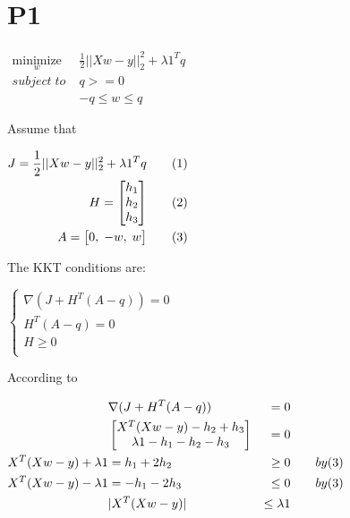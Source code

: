 \documentclass{article}
\newcommand{\under}[2]{\mathop{#1}\limits_{#2}}
\newcommand{\B}[1]{\left\{\begin{aligned}#1\end{aligned}\right.}
\begin{document}
\section{P1}

\begin{center}
  $
  \begin{aligned}
    \under{minimize}{w} \;  & \frac{1}{2} ||Xw-y||^2_2 + \lambda 1^T q \\
    subject \; to \;        & q>=0 \\
                            & -q \le w \le q
  \end{aligned}
  $ \\
\end{center}

Assume that
\begin{center}
  $
  \begin{aligned}
    J = \frac{1}{2} ||Xw-y||^2_2 + \lambda 1^T q & \qquad (1) \\
    \Matrix{H}{h_1 \\ h_2 \\ h_3}                & \qquad (2) \\
    \Matrix{A}{0, \; -w, \; w}                   & \qquad (3) \\
  \end{aligned}
  $ \\
\end{center}

The KKT conditions are: \\
\begin{center}
$
  \B{
    \nabla (J+H^T(A-q)) = 0 \\
    H^T(A-q) = 0 \\
    H \ge 0 \\
  }
$ \\
\end{center}

According to \\
\begin{center}
  $
  \begin{aligned}
                         & \nabla (J+H^T(A-q))                                             & = 0          & \\
                         & \Matrix{}{X^T(Xw-y) - h_2 + h_3 \\ \lambda 1 - h_1 - h_2 - h_3} & = 0          & \\
    X^T(Xw-y) + \lambda1 & = h_1 + 2 h_2                                                   & \ge 0        & \qquad by (3)\\
    X^T(Xw-y) - \lambda1 & = -h_1 - 2 h_3                                                  & \le 0        & \qquad by (3)\\
                         & |X^T(Xw-y)|                                                     & \le \lambda1 & \\
  \end{aligned}
  $
\end{center}
\end{document}
